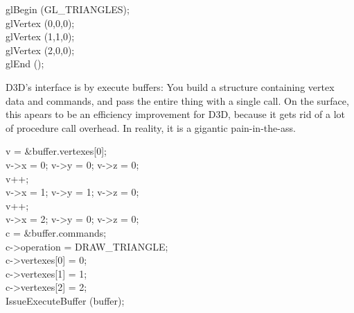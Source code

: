 \begin{allintypewriter}
glBegin (GL\_TRIANGLES);\\ 
glVertex (0,0,0);\\ 
glVertex (1,1,0);\\ 
glVertex (2,0,0);\\ 
glEnd ();\\ 

\par
D3D's interface is by execute buffers: You build a structure containing vertex data and commands, and pass 
the entire thing with a single call. On the surface, this apears to be an efficiency improvement for D3D, 
because it gets rid of a lot of procedure call overhead. In reality, it is a gigantic pain-in-the-ass.\\ 
\par

v = \&buffer.vertexes[0];\\ 
v->x = 0; v->y = 0; v->z = 0;\\ 
v++;\\ 
v->x = 1; v->y = 1; v->z = 0;\\ 
v++;\\ 
v->x = 2; v->y = 0; v->z = 0;\\ 
c = \&buffer.commands;\\ 
c->operation = DRAW\_TRIANGLE;\\ 
c->vertexes[0] = 0;\\ 
c->vertexes[1] = 1;\\ 
c->vertexes[2] = 2;\\ 
IssueExecuteBuffer (buffer);\\ 


\end{allintypewriter}
